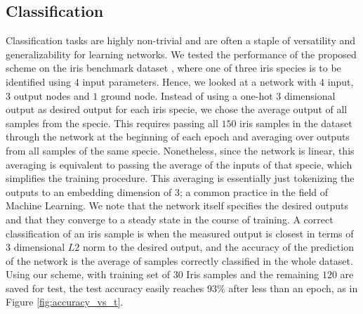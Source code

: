 \documentclass[%
 reprint,
 amsmath,amssymb,
 aps,
]{revtex4-2}
\begin{document}
\subsection{Classification}\label{sec:Classification}

    Classification tasks are highly non-trivial and are often a staple of versatility and generalizability for learning networks. We tested the performance of the proposed scheme on the iris benchmark dataset \cite{fisher1936use}, where one of three iris species is to be identified using $4$ input parameters. Hence, we looked at a network with $4$ input, $3$ output nodes and $1$ ground node. Instead of using a one-hot $3$ dimensional output as desired output for each iris specie, we chose the average output of all samples from the specie. This requires passing all $150$ iris samples in the dataset through the network at the beginning of each epoch and averaging over outputs from all samples of the same specie. Nonetheless, since the network is linear, this averaging is equivalent to passing the average of the inputs of that specie, which simplifies the training procedure. This averaging is essentially just tokenizing the outputs to an embedding dimension of $3$; a common practice in the field of Machine Learning. We note that the network itself specifies the desired outputs and that they converge to a steady state in the course of training. A correct classification of an iris sample is when the measured output is closest in terms of $3$ dimensional $L2$ norm to the desired output, and the accuracy of the prediction of the network is the average of samples correctly classified in the whole dataset. Using our scheme, with training set of $30$ Iris samples and the remaining $120$ are saved for test, the test accuracy easily reaches $93\%$ after less than an epoch, as in Figure \ref{fig:accuracy_vs_t}.
\end{document}
